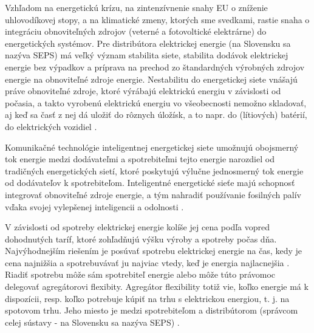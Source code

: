 Vzhľadom na energetickú krízu, na zintenzívnenie snahy EU o zníženie uhlovodíkovej stopy, a na klimatické zmeny, ktorých sme svedkami, rastie snaha o integráciu obnoviteľných zdrojov (veterné a fotovoltické elektrárne) do energetických systémov. Pre distribútora elektrickej energie (na Slovensku sa nazýva SEPS) má veľký význam stabilita siete, stabilita dodávok elektrickej energie bez výpadkov a príprava na prechod zo štandardných výrobných zdrojov energie na obnoviteľné zdroje energie. Nestabilitu do energetickej siete vnášajú práve obnoviteľné zdroje, ktoré výrábajú elektrickú energiu v závislosti od počasia, a takto vyrobenú elektrickú energiu vo všeobecnosti nemožno skladovať, aj keď sa časť z nej dá uložiť do rôznych úložísk, a to napr. do (lítiových) batérií, do elektrických vozidiel \cite{renewableenergybook1, smartgrid0book, sepswebiste2024}.

Komunikačné technológie inteligentnej energetickej siete umožnujú obojsmerný tok energie medzi dodávateľmi a spotrebiteľmi tejto energie narozdiel od tradičných energetických sietí, ktoré poskytujú výlučne jednosmerný tok energie od dodávateľov k spotrebiteľom. Inteligentné energetické sieťe majú schopnosť integrovať obnoviteľné zdroje energie, a tým nahradiť používanie fosilných palív vďaka svojej vylepšenej inteligencii a odolnosti \cite{smartgrid0book}. 



V závislosti od spotreby elektrickej energie kolíše jej cena podľa vopred dohodnutých taríf, ktoré zohľadňujú výšku výroby a spotreby počas dňa. Najvýhodnejším riešením je posúvať spotrebu elektrickej energie na čas, kedy je cena najnižšia a spotrebuvávať ju  najviac vtedy, keď je energia najlacnejšia \cite{dynamicpricingbook1, Lee2020PricingEC}. Riadiť spotrebu môže sám spotrebiteľ energie alebo môže túto právomoc delegovať agregátorovi flexibity. Agregátor flexibility totiž vie, koľko energie má k dispozícii, resp. koľko potrebuje kúpiť na trhu s elektrickou energiou, t. j. na spotovom trhu. Jeho miesto je medzi spotrebiteľom a distribútorom (správcom celej sústavy - na Slovensku sa nazýva SEPS) \cite{aggregaorDR}. 

